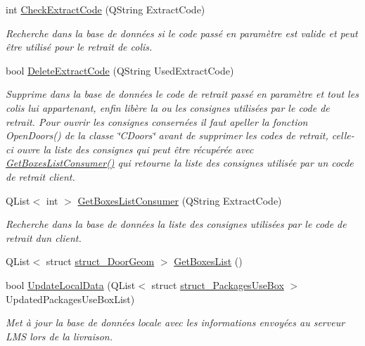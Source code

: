 \begin{DoxyCompactItemize}
int \hyperlink{class_c_s_q_lite___local___d_b_ad58d94663e785cd117ba466b22f55d05}{Check\+Extract\+Code} (Q\+String Extract\+Code)
\begin{DoxyCompactList}\small\item\em Recherche dans la base de données si le code passé en paramètre est valide et peut être utilisé pour le retrait de colis. \end{DoxyCompactList}\item 
bool \hyperlink{class_c_s_q_lite___local___d_b_a2431685493e32b890f7b038abbb7d48a}{Delete\+Extract\+Code} (Q\+String Used\+Extract\+Code)
\begin{DoxyCompactList}\small\item\em Supprime dans la base de données le code de retrait passé en paramètre et tout les colis lui appartenant, enfin libère la ou les consignes utilisées par le code de retrait. Pour ouvrir les consignes consernées il faut apeller la fonction Open\+Doors() de la classe \char`\"{}\+C\+Doors\char`\"{} avant de supprimer les codes de retrait, celle-\/ci ouvre la liste des consignes qui peut être récupérée avec \hyperlink{class_c_s_q_lite___local___d_b_a563fa1aa825325f4245acbed8ec6be39}{Get\+Boxes\+List\+Consumer()} qui retourne la liste des consignes utilisée par un cocde de retrait client. \end{DoxyCompactList}\item 
Q\+List$<$ int $>$ \hyperlink{class_c_s_q_lite___local___d_b_a563fa1aa825325f4245acbed8ec6be39}{Get\+Boxes\+List\+Consumer} (Q\+String Extract\+Code)
\begin{DoxyCompactList}\small\item\em Recherche dans la base de données la liste des consignes utilisées par le code de retrait d\textquotesingle{}un client. \end{DoxyCompactList}\item 
Q\+List$<$ struct \hyperlink{structstruct___door_geom}{struct\+\_\+\+Door\+Geom} $>$ \hyperlink{class_c_s_q_lite___local___d_b_aa26c4ee27cb0551f970569d402c3fe67}{Get\+Boxes\+List} ()
\item 
bool \hyperlink{class_c_s_q_lite___local___d_b_a650c693de81299bb9fd3f0671c0ab9d7}{Update\+Local\+Data} (Q\+List$<$ struct \hyperlink{structstruct___packages_use_box}{struct\+\_\+\+Packages\+Use\+Box} $>$ Updated\+Packages\+Use\+Box\+List)
\begin{DoxyCompactList}\small\item\em Met à jour la base de données locale avec les informations envoyées au serveur L\+M\+S lors de la livraison. \end{DoxyCompactList}\item 

\end{DoxyCompactItemize}
